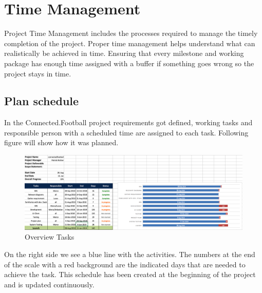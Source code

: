 \section{Time Management}
\label{sec:time}
Project Time Management includes the processes required to manage the timely completion of the project. Proper time management helps understand what can realistically be achieved in time. Ensuring that every milestone and working package has enough time assigned with a buffer if something goes wrong so the project stays in time.

\subsection{Plan schedule}
In the Connected.Football project requirements got defined, working tasks and responsible person with a scheduled time are assigned to each task. Following figure will show how it was planned.
\begin{figure}[H]
  \includegraphics[width=\linewidth]{content/diagram/time/timemangement.png}
  \caption{Overview Tasks}
\end{figure}
On the right side we see a blue line with the activities. The numbers at the end of the scale with a red background are the indicated days that are needed to achieve the task. This schedule has been created at the beginning of the project and is updated continuously. 
\newpage

